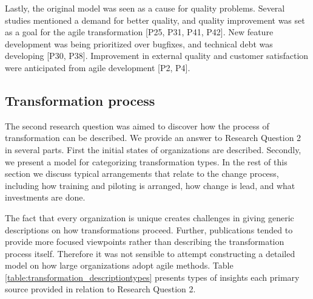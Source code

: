 \documentclass[preprint,authoryear,12pt]{elsarticle}
\begin{document}
Lastly, the original model was seen as a cause for quality problems.
Several studies mentioned a demand for better quality, and quality improvement
was set as a goal for the agile transformation [P25, P31, P41, P42]. New feature
development was being prioritized over bugfixes, and technical debt was
developing [P30, P38]. Improvement in external quality and customer satisfaction
were anticipated from agile development [P2, P4].


\clearpage

\subsection{Transformation process}

The second research question was aimed to discover how the process of
transformation can be described.
We provide an answer to Research Question 2 in several parts. First the initial
states of organizations are described. Secondly, we present a model for
categorizing transformation types. In the rest of this section we discuss
typical arrangements that relate to the change process, including how training
and piloting is arranged, how change is lead, and what investments are done.

The fact that every organization is unique creates challenges in giving generic
descriptions on how transformations proceed. Further, publications tended to
provide more focused viewpoints rather than describing the transformation
process itself. Therefore it was not sensible to attempt constructing a detailed
model on how large organizations adopt agile methods.
Table \ref{table:transformation_descriptiontypes} presents types of insights
each primary source provided in relation to Research Question 2.
\end{document}
